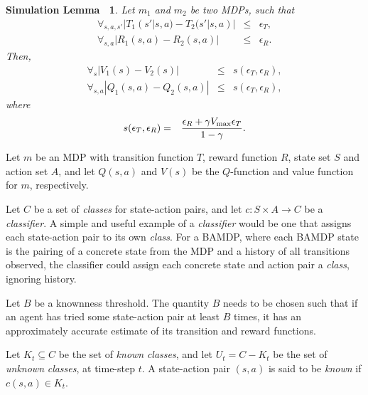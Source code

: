 \newtheorem*{simlemma}{Simulation Lemma~\cite{lihong09simlemma,kearns02}}
\begin{simlemma}

\label{sec:pacmdp:simulation}
Let $m_1$ and $m_2$ be two MDPs, such that
\begin{eqnarray}
\forall_{s,a,s'} |T_1(s'|s,a) - T_2(s'|s,a)| &\leq& \epsilon_T,\\
\forall_{s,a} |R_1(s,a) - R_2(s,a)| &\leq& \epsilon_R.
\end{eqnarray}
Then,
\begin{eqnarray}
\forall_s |V_1(s) - V_2(s)| &\leq& s(\epsilon_T,\epsilon_R),\\
\forall_{s,a} |Q_1(s,a) - Q_2(s,a)| &\leq& s(\epsilon_T,\epsilon_R),
\end{eqnarray}
where
\begin{eqnarray}
s(\epsilon_T,\epsilon_R) &=& \frac {\epsilon_R + \gamma V_{\rm max} \epsilon_T} {1-\gamma}.
\end{eqnarray}
\end{simlemma}

\begin{defn}
Let $m$ be an MDP with transition function $T$, reward function $R$, state set $S$ and action set $A$, and let $Q(s,a)$ and $V(s)$ be the $Q$-function and value function for $m$, respectively.
\end{defn}

\begin{defn}
Let $C$ be a set of \emph{classes} for state-action pairs, and let $c:S\times A\rightarrow C$ be a \emph{classifier}. A simple and useful example of a \emph{classifier} would be one that assigns each state-action pair to its own \emph{class}. For a BAMDP, where each BAMDP state is the pairing of a concrete state from the MDP and a history of all transitions observed, the classifier could assign each concrete state and action pair a \emph{class}, ignoring history.
\end{defn}

\begin{defn}
Let $B$ be a knownness threshold. The quantity $B$ needs to be chosen such that if an agent has tried some state-action pair at least $B$ times, it has an approximately accurate estimate of its transition and reward functions.
\end{defn}

\begin{defn}
Let $K_t \subseteq C$ be the set of \emph{known} \emph{classes}, and let $U_t = C - K_t$ be the set of \emph{unknown} \emph{classes}, at time-step $t$. A state-action pair $(s,a)$ is said to be \emph{known} if $c(s,a) \in K_t$.
\end{defn}

